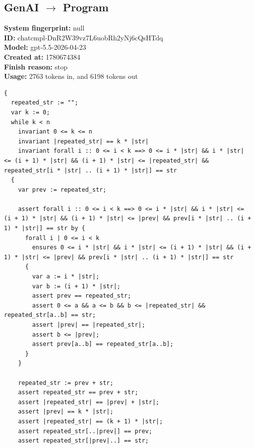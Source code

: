 \documentclass{article}
\begin{document}
\subsection*{GenAI $\rightarrow$ Program}
\textbf{System fingerprint: }null
\\\textbf{ID: }chatcmpl-DnR2W39vz7L6uobRh2yNj6cQsHTdq
\\\textbf{Model: }gpt-5.5-2026-04-23
\\\textbf{Created at: }1780674384
\\\textbf{Finish reason: }stop
\\\textbf{Usage: }2763 tokens in, and 6198 tokens out
\begin{lstlisting}
{
  repeated_str := "";
  var k := 0;
  while k < n
    invariant 0 <= k <= n
    invariant |repeated_str| == k * |str|
    invariant forall i :: 0 <= i < k ==> 0 <= i * |str| && i * |str| <= (i + 1) * |str| && (i + 1) * |str| <= |repeated_str| && repeated_str[i * |str| .. (i + 1) * |str|] == str
  {
    var prev := repeated_str;

    assert forall i :: 0 <= i < k ==> 0 <= i * |str| && i * |str| <= (i + 1) * |str| && (i + 1) * |str| <= |prev| && prev[i * |str| .. (i + 1) * |str|] == str by {
      forall i | 0 <= i < k
        ensures 0 <= i * |str| && i * |str| <= (i + 1) * |str| && (i + 1) * |str| <= |prev| && prev[i * |str| .. (i + 1) * |str|] == str
      {
        var a := i * |str|;
        var b := (i + 1) * |str|;
        assert prev == repeated_str;
        assert 0 <= a && a <= b && b <= |repeated_str| && repeated_str[a..b] == str;
        assert |prev| == |repeated_str|;
        assert b <= |prev|;
        assert prev[a..b] == repeated_str[a..b];
      }
    }

    repeated_str := prev + str;
    assert repeated_str == prev + str;
    assert |repeated_str| == |prev| + |str|;
    assert |prev| == k * |str|;
    assert |repeated_str| == (k + 1) * |str|;
    assert repeated_str[..|prev|] == prev;
    assert repeated_str[|prev|..] == str;


\end{lstlisting}
\end{document}
